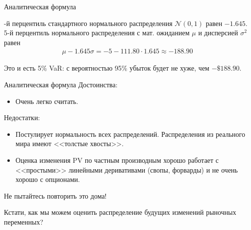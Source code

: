 \documentclass{beamer}
\begin{document}
\begin{frame}{Аналитическая формула}
\centering
{}

-й перцентиль стандартного нормального распределения $\mathcal{N}(0, 1)$ равен $-1.645$. 5-й перцентиль нормального распределения с мат. ожиданием $\mu$ и дисперсией $\sigma^2$ равен
\begin{align*}
\mu - 1.645\sigma = -5 - 111.80\cdot 1.645 \approx -188.90
\end{align*}

\justify
Это и есть 5\% VaR: с вероятностью 95\% убыток будет не хуже, чем $-\$188.90$.
\end{frame}



\begin{frame}{Аналитическая формула}
\justify
Достоинства:
\begin{itemize}
\justifying
\item Очень легко считать.
\end{itemize}

\justify
Недостатки:
\begin{itemize}
\justifying
\item Постулирует нормальность всех распределений. Распределения из реального мира имеют <<толстые хвосты>>.
\item Оценка изменения PV по частным производным хорошо работает с <<простыми>> линейными деривативами (свопы, форварды) и не очень хорошо с опционами.
\end{itemize}

\justify
Не пытайтесь повторить это дома!

\justify
Кстати, как мы можем оценить распределение \alert{будущих} изменений рыночных переменных?
\end{frame}
\end{document}

